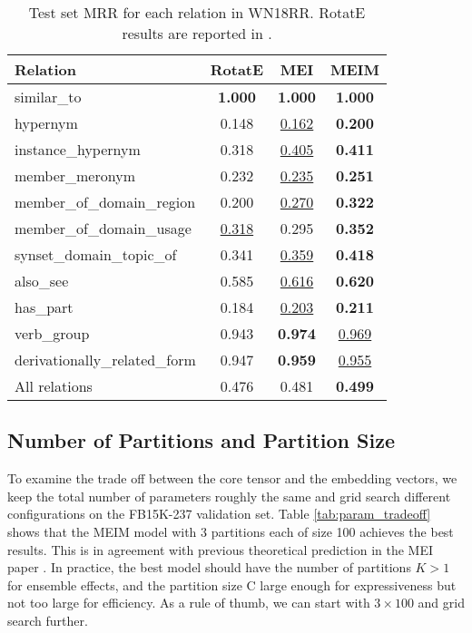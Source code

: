 \documentclass{article}
\theoremstyle{plain}
\theoremstyle{remark}
\begin{document}
\begin{table}[ht]
	\caption[]{Test set MRR for each relation in WN18RR. RotatE results are reported in \cite{zhang_quaternionknowledgegraph_2019}.}
	\label{tab:result_detailrelation}
	\centering  
	\begin{adjustbox}{max width=\linewidth}
		\begin{tabular}{@{\extracolsep{2pt}}lcc|c}


			Relation & RotatE & MEI & MEIM \\
			\midrule
			
			similar\_to & \textbf{1.000} & \textbf{1.000} & \textbf{1.000} \\ hypernym & 0.148 & \underline{0.162} & \textbf{0.200} \\ instance\_hypernym & 0.318 & \underline{0.405} & \textbf{0.411} \\ member\_meronym & 0.232 & \underline{0.235} & \textbf{0.251} \\ member\_of\_domain\_region & 0.200 & \underline{0.270} & \textbf{0.322} \\ member\_of\_domain\_usage & \underline{0.318} & 0.295 & \textbf{0.352} \\ synset\_domain\_topic\_of & 0.341 & \underline{0.359} & \textbf{0.418} \\ also\_see & 0.585 & \underline{0.616} & \textbf{0.620} \\ has\_part & 0.184 & \underline{0.203} & \textbf{0.211} \\ verb\_group & 0.943 & \textbf{0.974} & \underline{0.969} \\ derivationally\_related\_form & 0.947 & \textbf{0.959} & \underline{0.955} \\ 

			\midrule
			
			All relations & 0.476 & 0.481 & \textbf{0.499} \\
			
\end{tabular}
	\end{adjustbox}
\end{table}

\subsection{Number of Partitions and Partition Size}
To examine the trade off between the core tensor and the embedding vectors, we keep the total number of parameters roughly the same and grid search different configurations on the FB15K-237 validation set. Table \ref{tab:param_tradeoff} shows that the MEIM model with 3 partitions each of size 100 achieves the best results. This is in agreement with previous theoretical prediction in the MEI paper \cite{tran_multipartitionembeddinginteraction_2020}. In practice, the best model should have the number of partitions $ K > 1 $ for ensemble effects, and the partition size C large enough for expressiveness but not too large for efficiency. As a rule of thumb, we can start with $ 3 \times 100 $ and grid search further.
\end{document}

